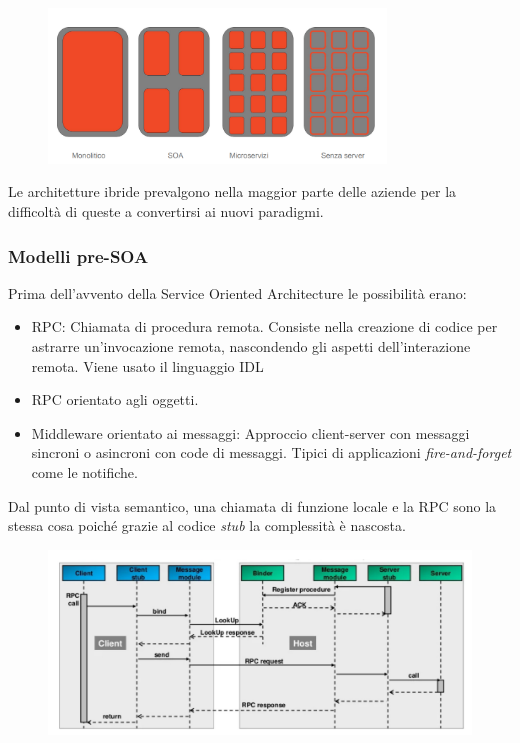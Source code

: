 \documentclass{article}
\begin{document}
		\begin{figure}[ht]
		\centering
		\includegraphics[width=0.8\textwidth]{SAC_A2_architecture_server.png}
		\end{figure}
		Le architetture ibride prevalgono nella maggior parte delle aziende per la difficoltà di queste a convertirsi ai nuovi paradigmi.
		
		\subsubsection{Modelli pre-SOA}
		
		Prima dell'avvento della Service Oriented Architecture le possibilità erano:
		\begin{itemize}
		    \item RPC: Chiamata di procedura remota. Consiste nella creazione di codice per astrarre un'invocazione remota, nascondendo gli aspetti dell'interazione remota. Viene usato il linguaggio IDL
		    \item RPC orientato agli oggetti.
		    \item Middleware orientato ai messaggi: Approccio client-server con messaggi sincroni o asincroni con code di messaggi. Tipici di applicazioni \textit{fire-and-forget} come le notifiche.
		\end{itemize}
		
		Dal punto di vista semantico, una chiamata di funzione locale e la RPC sono la stessa cosa poiché grazie al codice \emph{stub} la complessità è nascosta.
		
		\begin{figure}[ht]
			\centering
			\includegraphics[width=0.8\linewidth]{SAC_A3_rpc}

			\label{fig:saca3rpc}
		\end{figure}
\end{document}
